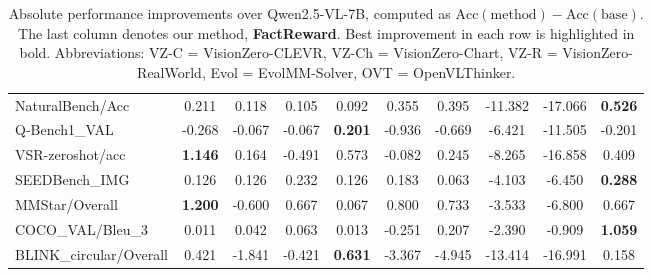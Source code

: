 \begin{table}[t]
\begin{tabular}{lccccccccc}
NaturalBench/Acc             & 0.211 & 0.118 & 0.105 & 0.092 & 0.355 & 0.395 & -11.382 & -17.066 & \textbf{0.526} \\
Q-Bench1\_VAL                & -0.268 & -0.067 & -0.067 & \textbf{0.201} & -0.936 & -0.669 & -6.421 & -11.505 & -0.201 \\
VSR-zeroshot/acc             & \textbf{1.146} & 0.164 & -0.491 & 0.573 & -0.082 & 0.245 & -8.265 & -16.858 & 0.409 \\
SEEDBench\_IMG               & 0.126 & 0.126 & 0.232 & 0.126 & 0.183 & 0.063 & -4.103 & -6.450 & \textbf{0.288} \\
MMStar/Overall               & \textbf{1.200} & -0.600 & 0.667 & 0.067 & 0.800 & 0.733 & -3.533 & -6.800 & 0.667 \\
COCO\_VAL/Bleu\_3            & 0.011 & 0.042 & 0.063 & 0.013 & -0.251 & 0.207 & -2.390 & -0.909 & \textbf{1.059} \\
BLINK\_circular/Overall      & 0.421 & -1.841 & -0.421 & \textbf{0.631} & -3.367 & -4.945 & -13.414 & -16.991 & 0.158 \\
\bottomrule
\end{tabular}
\caption{Absolute performance improvements over Qwen2.5-VL-7B, computed as $\mathrm{Acc(method)} - \mathrm{Acc(base)}$. The last column denotes our method, \textbf{FactReward}. Best improvement in each row is highlighted in bold.
Abbreviations:
VZ-C = VisionZero-CLEVR,
VZ-Ch = VisionZero-Chart,
VZ-R = VisionZero-RealWorld,
Evol = EvolMM-Solver,
OVT = OpenVLThinker.
}
\label{tab:main_results}
\end{table}
